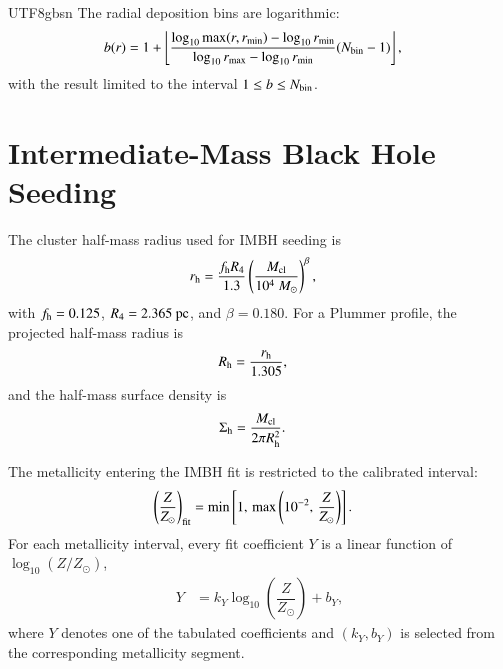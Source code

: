 \documentclass[trackchanges, twocolappendix, twocolumn]{aastex701}
\begin{document}
\begin{CJK*}{UTF8}{gbsn}
The radial deposition bins are logarithmic:
\begin{align}
b(r) &= 1+\left\lfloor
\dfrac{\log_{10}\max(r,r_{\min})-\log_{10}r_{\min}}
{\log_{10}r_{\max}-\log_{10}r_{\min}}
(N_{\rm bin}-1)
\right\rfloor ,
\end{align}
with the result limited to the interval $1\leq b\leq N_{\rm bin}$.

\section{Intermediate-Mass Black Hole Seeding}
\label{app:imbh_equations}

The cluster half-mass radius used for IMBH seeding is
\begin{align}
r_{\rm h} &=
\dfrac{f_{\rm h}R_4}{1.3}
\left(\dfrac{M_{\rm cl}}{10^4~M_\odot}\right)^{\beta},
\end{align}
with $f_{\rm h}=0.125$, $R_4=2.365~{\rm pc}$, and $\beta=0.180$. For a Plummer profile, the projected half-mass radius is
\begin{align}
R_{\rm h} &= \dfrac{r_{\rm h}}{1.305},
\end{align}
and the half-mass surface density is
\begin{align}
\Sigma_{\rm h} &=
\dfrac{M_{\rm cl}}{2\pi R_{\rm h}^2}.
\end{align}

The metallicity entering the IMBH fit is restricted to the calibrated interval:
\begin{align}
\left(\dfrac{Z}{Z_{\odot}}\right)_{\rm fit}
&=\min\left[
1,\,
\max\left(10^{-2},\,\dfrac{Z}{Z_{\odot}}\right)
\right].
\end{align}
For each metallicity interval, every fit coefficient $Y$ is a linear function of $\log_{10}(Z/Z_{\odot})$,
\begin{align}
Y &= k_Y\log_{10}\left(\dfrac{Z}{Z_{\odot}}\right)+b_Y,
\end{align}
where $Y$ denotes one of the tabulated coefficients and $(k_Y,b_Y)$ is selected from the corresponding metallicity segment.


\end{CJK*}
\end{document}
